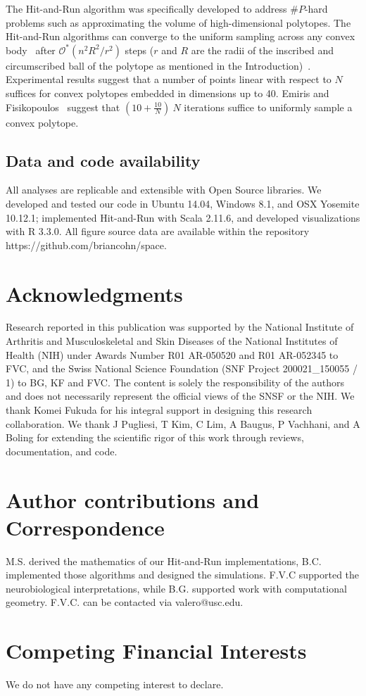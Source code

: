 \documentclass[letterpaper]{article}
\begin{document}
The Hit-and-Run algorithm was specifically developed to address $\#P$-hard problems such as approximating the volume of high-dimensional polytopes\cite{Dyer}. The Hit-and-Run algorithms can converge to the uniform sampling across any convex body~\cite{smith1984efficient} after $\mathcal{O}^*(n^2R^2/r^2)$ steps ($r$ and $R$ are the radii of the inscribed and circumscribed ball of the polytope as mentioned in the Introduction)~\cite{Dyer, Lovasz}. Experimental results suggest that a number of points linear with respect to $N$ suffices for convex polytopes embedded in dimensions up to 40. Emiris and Fisikopoulos~\cite{emiris2013efficient} suggest that $(10 + \frac{10}{N})~N$ iterations suffice to uniformly sample a convex polytope.

\subsection*{Data and code availability}
All analyses are replicable and extensible with Open Source libraries. We developed and tested our code in Ubuntu 14.04, Windows 8.1, and OSX Yosemite 10.12.1; implemented Hit-and-Run with Scala 2.11.6, and developed visualizations with R 3.3.0.
All figure source data are available within the repository https://github.com/briancohn/space.

\section*{Acknowledgments}
Research reported in this publication was supported by the National Institute of Arthritis and Musculoskeletal and Skin Diseases of the National Institutes of Health (NIH) under Awards Number R01 AR-050520 and R01 AR-052345 to FVC, and the Swiss National Science Foundation (SNF Project 200021\_150055 / 1) to BG, KF and FVC. The content is solely the responsibility of the authors and does not necessarily represent the official views of the SNSF or the NIH. We thank Komei Fukuda for his integral support in designing this research collaboration. We thank J Pugliesi, T Kim, C Lim, A Baugus, P Vachhani, and A Boling for extending the scientific rigor of this work through reviews, documentation, and code.

\section*{Author contributions and Correspondence}
M.S. derived the mathematics of our Hit-and-Run implementations, B.C. implemented those algorithms and designed the simulations. F.V.C supported the neurobiological interpretations, while B.G. supported work with computational geometry. F.V.C. can be contacted via valero@usc.edu.

\section*{Competing Financial Interests}
We do not have any competing interest to declare.



% 
\end{document}
